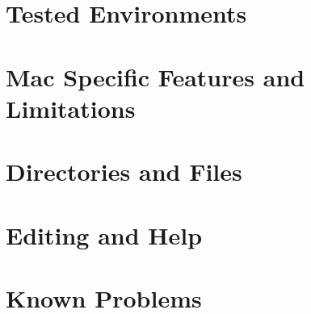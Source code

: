 
\section{Tested Environments}

\section{Mac Specific Features and Limitations}

\section{Directories and Files}

\section{Editing and Help}

\section{Known Problems}



